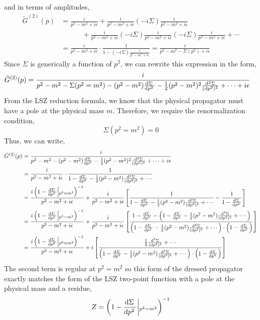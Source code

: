 \documentclass{article}
\begin{document}
and in terms of amplitudes,
\begin{align*} 
\tilde{G}^{(2)}(p) & = \frac{i}{p^2 - m^2 + i \epsilon} + \frac{i}{p^2 - m^2 + i \epsilon} ( - i \Sigma) \frac{i}{p^2 - m^2 + i \epsilon} \\
& \quad \quad \quad +
 \frac{i}{p^2 - m^2 + i \epsilon} ( - i \Sigma) \frac{i}{p^2 - m^2 + i \epsilon}  ( - i \Sigma) \frac{i}{p^2 - m^2 + i \epsilon}  + \cdots 
\\
& = \frac{i}{p^2 - m^2 + i \epsilon} \cdot \frac{1}{1 - ( - i \Sigma) \frac{i}{p^2 - m^2 + i \epsilon}} = \frac{i}{p^2 - m^2 - \Sigma(p^2) + i \epsilon}
\end{align*}
Since $\Sigma$ is generically a function of $p^2$, we can rewrite this expression in the form,
\begin{align*}
\tilde{G}^{(2)}(p) & = \frac{i}{p^2 - m^2 - \Sigma(p^2 = m^2) - (p^2 - m^2) \frac{\mathrm{d}\Sigma \:}{\mathrm{d}p^2 \:} - \tfrac{1}{2} (p^2 - m^2)^2 \frac{\mathrm{d}^2 \Sigma}{(\mathrm{d} p^2)^2} + \cdots + i \epsilon}
\end{align*}
From the LSZ reduction formula, we know that the physical propagator must have a pole at the physical mass $m$. Therefore, we require the renormalization condition, 
\[\Sigma(p^2 = m^2) = 0\]
Thus, we can write,
\begin{align*}
\tilde{G}^{(2)}(p) & = \frac{i}{p^2 - m^2  - (p^2 - m^2) \frac{\mathrm{d}\Sigma \:}{\mathrm{d}p^2 \:} - \tfrac{1}{2} (p^2 - m^2)^2 \frac{\mathrm{d}^2 \Sigma}{(\mathrm{d} p^2)^2} + \cdots + i \epsilon}
\\
& = \frac{i}{p^2 - m^2 + i \epsilon} \cdot \frac{1}{1 - \frac{\mathrm{d}\Sigma \:}{\mathrm{d}p^2 \:} - \tfrac{1}{2} (p^2 - m^2) \frac{\mathrm{d}^2 \Sigma}{(\mathrm{d} p^2)^2} + \cdots }
\\
& = \frac{i \left(1 - \frac{\mathrm{d}\Sigma \:}{\mathrm{d}p^2 \:} \middle|_{p^2 = m^2} \right)^{-1}}{p^2 - m^2 + i \epsilon} + \frac{i}{p^2 - m^2 + i \epsilon} \left[ \frac{1}{1 - \frac{\mathrm{d}\Sigma \:}{\mathrm{d}p^2 \:} - \tfrac{1}{2} (p^2 - m^2) \frac{\mathrm{d}^2 \Sigma}{(\mathrm{d} p^2)^2} + \cdots } - \frac{1}{1 - \frac{\mathrm{d}\Sigma \:}{\mathrm{d}p^2 \:} } \right] 
\\
& = \frac{i \left(1 - \frac{\mathrm{d}\Sigma \:}{\mathrm{d}p^2 \:} \middle|_{p^2 = m^2} \right)^{-1}}{p^2 - m^2 + i \epsilon} + \frac{i}{p^2 - m^2 + i \epsilon} \left[ \frac{1 - \frac{\mathrm{d}\Sigma \:}{\mathrm{d}p^2 \:} - \left(1 - \frac{\mathrm{d}\Sigma \:}{\mathrm{d}p^2 \:} - \tfrac{1}{2} (p^2 - m^2) \frac{\mathrm{d}^2 \Sigma}{(\mathrm{d} p^2)^2} + \cdots \right)}{\left(1 - \frac{\mathrm{d}\Sigma \:}{\mathrm{d}p^2 \:} - \tfrac{1}{2} (p^2 - m^2) \frac{\mathrm{d}^2 \Sigma}{(\mathrm{d} p^2)^2} + \cdots \right) \cdot \left(1 - \frac{\mathrm{d}\Sigma \:}{\mathrm{d}p^2 \:} \right) } \right]
\\
& = \frac{i \left(1 - \frac{\mathrm{d}\Sigma \:}{\mathrm{d}p^2 \:} \middle|_{p^2 = m^2} \right)^{-1}}{p^2 - m^2 + i \epsilon} + i \left[ \frac{ \tfrac{1}{2} \frac{\mathrm{d}^2 \Sigma}{(\mathrm{d} p^2)^2} + \cdots}{\left(1 - \frac{\mathrm{d}\Sigma \:}{\mathrm{d}p^2 \:} - \tfrac{1}{2} (p^2 - m^2) \frac{\mathrm{d}^2 \Sigma}{(\mathrm{d} p^2)^2} + \cdots \right) \cdot \left(1 - \frac{\mathrm{d}\Sigma \:}{\mathrm{d}p^2 \:} \right) } \right]
\end{align*}
The second term is regular at $p^2 = m^2$ so this form of the dressed propagator exactly matches the form of the LSZ two-point function with a pole at the physical mass and a residue,
\[ Z = \left(1 - \frac{\mathrm{d}\Sigma \:}{\mathrm{d}p^2 \:} \middle|_{p^2 = m^2} \right)^{-1}\]
\end{document}
